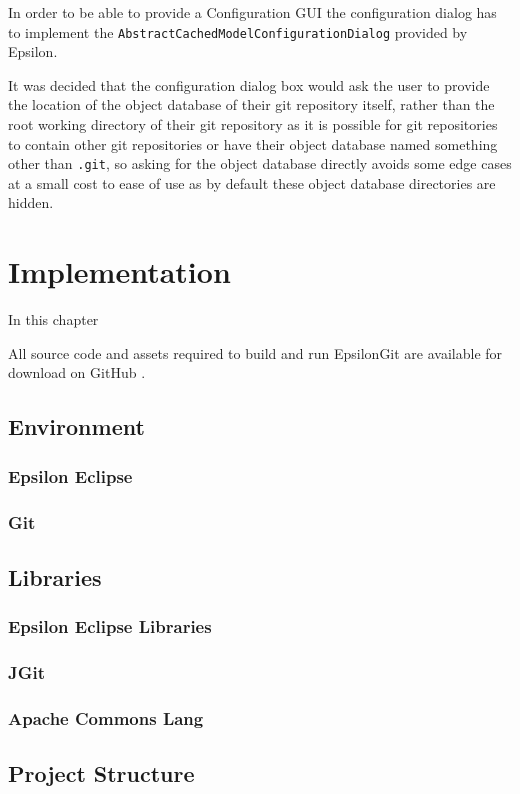 \documentclass[11pt]{book}
\newcommand{\code}[1]{\texttt{#1}}
\begin{document}
In order to be able to provide a Configuration GUI the configuration dialog has to implement the \code{AbstractCachedModelConfigurationDialog} provided by Epsilon.

It was decided that the configuration dialog box would ask the user to provide the location of the object database of their git repository itself, rather than the root working directory of their git repository as it is possible for git repositories to contain other git repositories or have their object database named something other than \code{.git}, so asking for the object database directly avoids some edge cases at a small cost to ease of use as by default these object database directories are hidden.

\chapter{Implementation}
In this chapter 

All source code and assets required to build and run EpsilonGit are available for download on GitHub \cite{epsilongitgithub}. 

\section{Environment}
\subsection{Epsilon Eclipse}
\subsection{Git}

\section{Libraries}
\subsection{Epsilon Eclipse Libraries}
\subsection{JGit}
\subsection{Apache Commons Lang}

\section{Project Structure}
\end{document}
